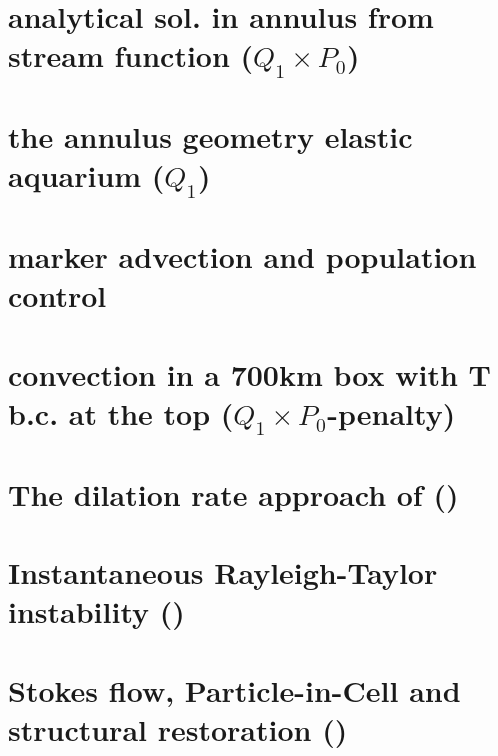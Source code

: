 \documentclass[a4paper,11pt]{report}
\begin{document}
\chapter{analytical sol. in annulus from stream function ($Q_1\times P_0$) \label{f35}} %

\chapter{the annulus geometry elastic aquarium ($Q_1$)\label{f36}}%

\chapter{marker advection and population control \label{f37}} %

\chapter{convection in a 700km box with T b.c. at the top  ($Q_1\times P_0$-penalty) \label{f38}} %

\chapter{The dilation rate approach of \textcite{chpe15} (\QtwoQone) \label{f39}} %

\chapter{Instantaneous Rayleigh-Taylor instability (\QtwoQone) \label{f40}} %

\chapter{Stokes flow, Particle-in-Cell and structural restoration (\QtwoQone) \label{f41}} %
\end{document}
